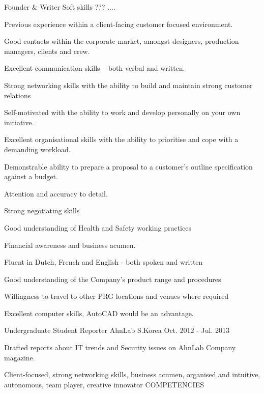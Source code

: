 \documentclass[11pt, a4paper]{awesome-cv}
\begin{document}
\begin{cventries}
	\cventry
	{Founder \& Writer}
	{Soft skills}
	{???}
	{....}
	{
		\begin{cvitems}
			\item Previous experience within a client-facing customer focused environment.
			\item Good contacts within the corporate market, amongst designers, production managers, clients and crew.
			\item Excellent communication skills – both verbal and written.
			\item Strong networking skills with the ability to build and maintain strong customer relations
			\item Self-motivated with the ability to work and develop personally on your own initiative.
			\item Excellent organisational skills with the ability to prioritise and cope with a demanding workload.
			\item Demonstrable ability to prepare a proposal to a customer’s outline specification against a budget.
			\item Attention and accuracy to detail.
			\item Strong negotiating skills
			\item Good understanding of Health and Safety working practices
			\item Financial awareness and business acumen.
			\item Fluent in Dutch, French and English - both spoken and written
			\item Good understanding of the Company’s product range and procedures
			\item Willingness to travel to other PRG locations and venues where required
			\item Excellent computer skills, AutoCAD would be an advantage.
		\end{cvitems}
	}
	\cventry
	{Undergraduate Student Reporter}
	{AhnLab}
	{S.Korea}
	{Oct. 2012 - Jul. 2013}
	{
		\begin{cvitems}
			\item {Drafted reports about IT trends and Security issues on AhnLab Company magazine.}
		\end{cvitems}
	}
\end{cventries}



Client-focused, strong networking skills, business acumen, organised and intuitive, autonomous, team player, creative innovator
COMPETENCIES
\end{document}
